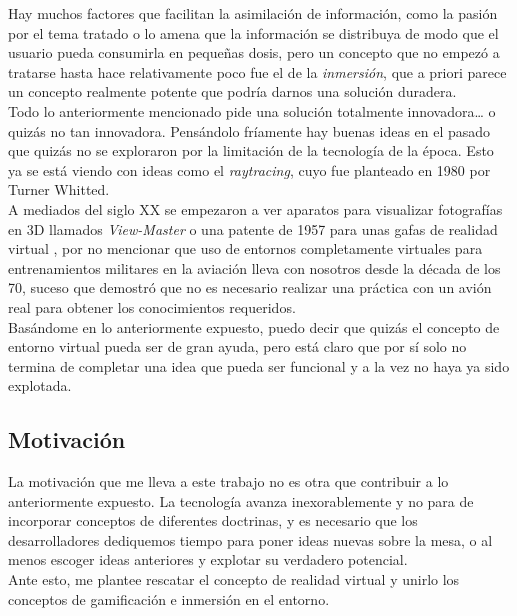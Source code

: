 \quad Hay muchos factores que facilitan la asimilación de información, como la pasión por el tema tratado o lo amena que la información se distribuya de modo que el usuario pueda consumirla en pequeñas dosis, pero un concepto que no empezó a tratarse hasta hace relativamente poco fue el de la \textit{inmersión}, que a priori parece un concepto realmente potente que podría darnos una solución duradera. \\

\quad Todo lo anteriormente mencionado pide una solución totalmente innovadora… o quizás no tan innovadora. Pensándolo fríamente hay buenas ideas en el pasado que quizás no se exploraron por la limitación de la tecnología de la época. Esto ya se está viendo con ideas como el \textit{raytracing}, cuyo fue planteado en 1980 por Turner Whitted.\\
\quad A mediados del siglo XX se empezaron a ver aparatos para visualizar fotografías en 3D llamados \textit{View-Master} o una patente de 1957 para unas gafas de realidad virtual \cite{Tech}, por no mencionar que uso de entornos completamente virtuales para entrenamientos militares en la aviación lleva con nosotros desde la década de los 70\cite{NCSA}, suceso que demostró que no es necesario realizar una práctica con un avión real para obtener los conocimientos requeridos.\\

\quad Basándome en lo anteriormente expuesto, puedo decir que quizás el concepto de entorno virtual pueda ser de gran ayuda, pero está claro que por sí solo no termina de completar una idea que pueda ser funcional y a la vez no haya ya sido explotada.\\

\subsection{Motivación}
\quad La motivación que me lleva a este trabajo no es otra que contribuir a lo anteriormente expuesto. La tecnología avanza inexorablemente y no para de incorporar conceptos de diferentes doctrinas, y es necesario que los desarrolladores dediquemos tiempo para poner ideas nuevas sobre la mesa, o al menos escoger ideas anteriores y explotar su verdadero potencial.\\

\quad Ante esto, me plantee rescatar el concepto de realidad virtual y unirlo los conceptos de gamificación\cite{Educativa}\cite{GameChina} e inmersión en el entorno.\\

